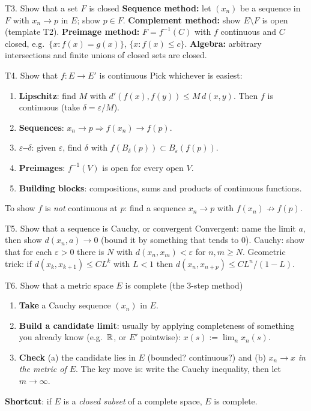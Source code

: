 \begin{steps}{T3. Show that a set $F$ is closed}
\textbf{Sequence method:} let $(x_n)$ be a sequence in $F$ with $x_n\to p$ in $E$; show $p\in F$.
\textbf{Complement method:} show $E\setminus F$ is open (template T2).
\textbf{Preimage method:} $F=f^{-1}(C)$ with $f$ continuous and $C$ closed, e.g.\
$\{x: f(x)=g(x)\}$, $\{x: f(x)\le c\}$.
\textbf{Algebra:} arbitrary intersections and finite unions of closed sets are closed.
\end{steps}

\begin{steps}{T4. Show that $f:E\to E'$ is continuous}
Pick whichever is easiest:
\begin{enumerate}
\item \textbf{Lipschitz}: find $M$ with $d'(f(x),f(y))\le M\,d(x,y)$. Then $f$ is continuous
  (take $\delta=\varepsilon/M$).
\item \textbf{Sequences}: $x_n\to p\Rightarrow f(x_n)\to f(p)$.
\item \textbf{$\varepsilon$--$\delta$}: given $\varepsilon$, find $\delta$ with
  $f(B_\delta(p))\subset B_\varepsilon(f(p))$.
\item \textbf{Preimages}: $f^{-1}(V)$ is open for every open $V$.
\item \textbf{Building blocks}: compositions, sums and products of continuous functions.
\end{enumerate}
To show $f$ is \emph{not} continuous at $p$: find a sequence $x_n\to p$ with
$f(x_n)\not\to f(p)$.
\end{steps}

\begin{steps}{T5. Show that a sequence is Cauchy, or convergent}
Convergent: name the limit $a$, then show $d(x_n,a)\to 0$ (bound it by something that tends to
$0$). Cauchy: show that for each $\varepsilon>0$ there is $N$ with $d(x_n,x_m)<\varepsilon$ for
$n,m\ge N$. Geometric trick: if $d(x_k,x_{k+1})\le CL^k$ with $L<1$ then
$d(x_n,x_{n+p})\le CL^n/(1-L)$.
\end{steps}

\begin{steps}{T6. Show that a metric space $E$ is complete (the 3-step method)}
\begin{enumerate}
\item \textbf{Take} a Cauchy sequence $(x_n)$ in $E$.
\item \textbf{Build a candidate limit}: usually by applying completeness of something you
  already know (e.g.\ $\mathbb R$, or $E'$ pointwise): $x(s):=\lim_n x_n(s)$.
\item \textbf{Check} (a) the candidate lies in $E$ (bounded? continuous?) and (b) $x_n\to x$
  \emph{in the metric of $E$}. The key move is: write the Cauchy inequality, then let
  $m\to\infty$.
\end{enumerate}
\textbf{Shortcut}: if $E$ is a \emph{closed subset} of a complete space, $E$ is complete.
\end{steps}

